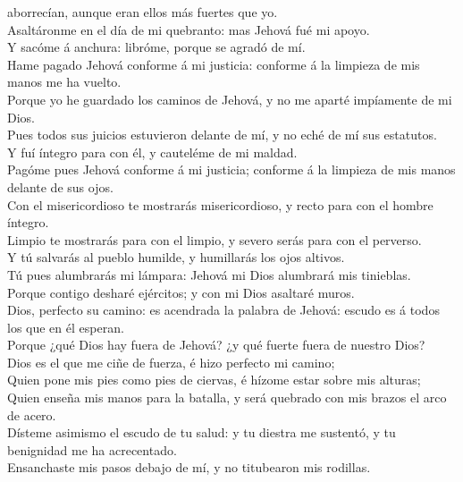 aborrecían, aunque eran ellos más fuertes que yo.\\
 Asaltáronme en el día de mi quebranto: mas Jehová fué mi
apoyo.\\
 Y sacóme á anchura: libróme, porque se agradó de mí.\\
 Hame pagado Jehová conforme á mi justicia: conforme á la
limpieza de mis manos me ha vuelto.\\
 Porque yo he guardado los caminos de Jehová, y no me
aparté impíamente de mi Dios.\\
 Pues todos sus juicios estuvieron delante de mí, y no eché
de mí sus estatutos.\\
 Y fuí íntegro para con él, y cauteléme de mi maldad.\\
 Pagóme pues Jehová conforme á mi justicia; conforme á la
limpieza de mis manos delante de sus ojos.\\
 Con el misericordioso te mostrarás misericordioso, y recto
para con el hombre íntegro.\\
 Limpio te mostrarás para con el limpio, y severo serás
para con el perverso.\\
 Y tú salvarás al pueblo humilde, y humillarás los ojos
altivos.\\
 Tú pues alumbrarás mi lámpara: Jehová mi Dios alumbrará
mis tinieblas.\\
 Porque contigo desharé ejércitos; y con mi Dios asaltaré
muros.\\
 Dios, perfecto su camino: es acendrada la palabra de
Jehová: escudo es á todos los que en él esperan.\\
 Porque ¿qué Dios hay fuera de Jehová? ¿y qué fuerte fuera
de nuestro Dios?\\
 Dios es el que me ciñe de fuerza, é hizo perfecto mi
camino;\\
 Quien pone mis pies como pies de ciervas, é hízome estar
sobre mis alturas;\\
 Quien enseña mis manos para la batalla, y será quebrado
con mis brazos el arco de acero.\\
 Dísteme asimismo el escudo de tu salud: y tu diestra me
sustentó, y tu benignidad me ha acrecentado.\\
 Ensanchaste mis pasos debajo de mí, y no titubearon mis
rodillas.\\
